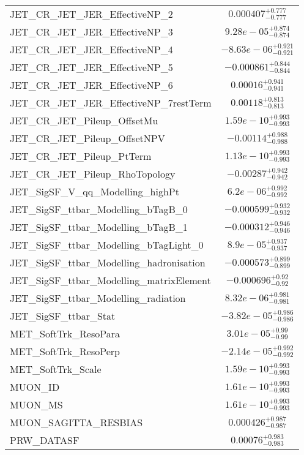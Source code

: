 \begin{tabular}{|l|c|}
JET\_CR\_JET\_JER\_EffectiveNP\_2 & $0.000407^{+0.777}_{-0.777}$ \\
JET\_CR\_JET\_JER\_EffectiveNP\_3 & $9.28e-05^{+0.874}_{-0.874}$ \\
JET\_CR\_JET\_JER\_EffectiveNP\_4 & $-8.63e-06^{+0.921}_{-0.921}$ \\
JET\_CR\_JET\_JER\_EffectiveNP\_5 & $-0.000861^{+0.844}_{-0.844}$ \\
JET\_CR\_JET\_JER\_EffectiveNP\_6 & $0.00016^{+0.941}_{-0.941}$ \\
JET\_CR\_JET\_JER\_EffectiveNP\_7restTerm & $0.00118^{+0.813}_{-0.813}$ \\
JET\_CR\_JET\_Pileup\_OffsetMu & $1.59e-10^{+0.993}_{-0.993}$ \\
JET\_CR\_JET\_Pileup\_OffsetNPV & $-0.00114^{+0.988}_{-0.988}$ \\
JET\_CR\_JET\_Pileup\_PtTerm & $1.13e-10^{+0.993}_{-0.993}$ \\
JET\_CR\_JET\_Pileup\_RhoTopology & $-0.00287^{+0.942}_{-0.942}$ \\
JET\_SigSF\_V\_qq\_Modelling\_highPt & $6.2e-06^{+0.992}_{-0.992}$ \\
JET\_SigSF\_ttbar\_Modelling\_bTagB\_0 & $-0.000599^{+0.932}_{-0.932}$ \\
JET\_SigSF\_ttbar\_Modelling\_bTagB\_1 & $-0.000312^{+0.946}_{-0.946}$ \\
JET\_SigSF\_ttbar\_Modelling\_bTagLight\_0 & $8.9e-05^{+0.937}_{-0.937}$ \\
JET\_SigSF\_ttbar\_Modelling\_hadronisation & $-0.000573^{+0.899}_{-0.899}$ \\
JET\_SigSF\_ttbar\_Modelling\_matrixElement & $-0.000696^{+0.92}_{-0.92}$ \\
JET\_SigSF\_ttbar\_Modelling\_radiation & $8.32e-06^{+0.981}_{-0.981}$ \\
JET\_SigSF\_ttbar\_Stat & $-3.82e-05^{+0.986}_{-0.986}$ \\
MET\_SoftTrk\_ResoPara & $3.01e-05^{+0.99}_{-0.99}$ \\
MET\_SoftTrk\_ResoPerp & $-2.14e-05^{+0.992}_{-0.992}$ \\
MET\_SoftTrk\_Scale & $1.59e-10^{+0.993}_{-0.993}$ \\
MUON\_ID & $1.61e-10^{+0.993}_{-0.993}$ \\
MUON\_MS & $1.61e-10^{+0.993}_{-0.993}$ \\
MUON\_SAGITTA\_RESBIAS & $0.000426^{+0.987}_{-0.987}$ \\
PRW\_DATASF & $0.00076^{+0.983}_{-0.983}$ \\

\end{tabular}
